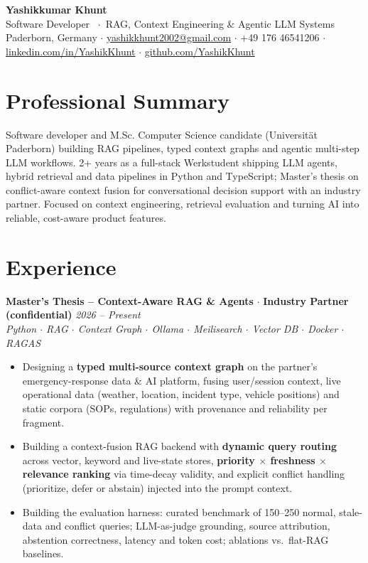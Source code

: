 \documentclass[a4paper,9pt]{extarticle}
\newcommand{\jobentry}[4]{%
	\vspace{2pt}\noindent%
	{\bfseries\color{black} #1} {\color{gray} $\cdot$ } {\bfseries\color{light} #2}%
	\hfill {\itshape\color{gray} #4}\\[1pt]%
	{\itshape\color{gray}\small #3}\par\vspace{1pt}%
}
\begin{document}
	{\fontsize{26}{30}\selectfont\bfseries\color{accent} Yashikkumar Khunt}\\[4pt]
	{\color{gray}\normalsize Software Developer \ $\cdot$\ RAG, Context Engineering \& Agentic LLM Systems}\\[5pt]
	{\small\color{gray}%
		Paderborn, Germany \enspace$\cdot$\enspace
		\href{mailto:yashikkhunt2002@gmail.com}{yashikkhunt2002@gmail.com} \enspace$\cdot$\enspace
		+49 176 46541206 \enspace$\cdot$\enspace
		\href{https://linkedin.com/in/YashikKhunt}{linkedin.com/in/YashikKhunt} \enspace$\cdot$\enspace
		\href{https://github.com/YashikKhunt}{github.com/YashikKhunt}%
	}\\[3pt]
	{\color{accent}\titlerule[1.5pt]}

	\section{Professional Summary}
	\justifying
	Software developer and M.Sc. Computer Science candidate (Universit\"at Paderborn) building RAG pipelines, typed context graphs and agentic multi-step LLM workflows. 2+ years as a full-stack Werkstudent shipping LLM agents, hybrid retrieval and data pipelines in Python and TypeScript; Master's thesis on conflict-aware context fusion for conversational decision support with an industry partner. Focused on context engineering, retrieval evaluation and turning AI into reliable, cost-aware product features.
	\RaggedRight

	\section{Experience}

	\jobentry{Master's Thesis -- Context-Aware RAG \& Agents}{Industry Partner (confidential)}{Python $\cdot$ RAG $\cdot$ Context Graph $\cdot$ Ollama $\cdot$ Meilisearch $\cdot$ Vector DB $\cdot$ Docker $\cdot$ RAGAS}{2026 -- Present}
	\begin{itemize}
		\item Designing a \textbf{typed multi-source context graph} on the partner's emergency-response data \& AI platform, fusing user/session context, live operational data (weather, location, incident type, vehicle positions) and static corpora (SOPs, regulations) with provenance and reliability per fragment.
		\item Building a context-fusion RAG backend with \textbf{dynamic query routing} across vector, keyword and live-state stores, \textbf{priority $\times$ freshness $\times$ relevance ranking} via time-decay validity, and explicit conflict handling (prioritize, defer or abstain) injected into the prompt context.
		\item Building the evaluation harness: curated benchmark of 150--250 normal, stale-data and conflict queries; LLM-as-judge grounding, source attribution, abstention correctness, latency and token cost; ablations vs.\ flat-RAG baselines.
	\end{itemize}
\end{document}
